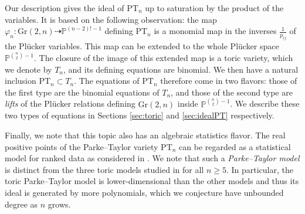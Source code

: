 \documentclass[12pt, reqno]{amsart}
\numberwithin{equation}{section}
\theoremstyle{plain}
\theoremstyle{definition}
\begin{document}
Our description gives the ideal of $\mathrm{PT}_n$ up to saturation by the product of the variables. It is based on the following observation: the map $\varphi_n:\mathrm{Gr}(2,n)\dashrightarrow \mathbb{P}^{(n-2)!-1}$ defining $\mathrm{PT}_n$ is a monomial map in the inverses $\frac{1}{p_{ij}}$ of the Pl\"ucker variables. This map can be extended to the whole Pl\"ucker space $\mathbb{P}^{\binom{n}{2}-1}$. The closure of the image of this extended map is a toric variety, which we denote by $T_n$, and its defining equations are binomial. We then have a natural inclusion $\mathrm{PT}_n\subset T_n$. The equations of $\mathrm{PT}_n$ therefore come in two flavors: those of the first type are the binomial equations of $T_n$, and those of the second type are \emph{lifts} of the Pl\"ucker relations defining $\mathrm{Gr}(2,n)$ inside $\mathbb{P}^{\binom{n}{2}-1}$. We describe these two types of equations in Sections \ref{sec:toric} and \ref{sec:idealPT} respectively.


Finally, we note that this topic also has an algebraic statistics flavor. The real positive points of the Parke--Taylor variety $\mathrm{PT}_n$ can be regarded as a statistical model for ranked data as considered in \cite{sturmfels2012statistical}. We note that such a \emph{Parke--Taylor model} is distinct from the three toric models studied in \cite{sturmfels2012statistical} for all $n \geq 5$. In particular, the toric Parke--Taylor model is lower-dimensional than the other models and thus its ideal is generated by more polynomials, which we conjecture have unbounded degree as $n$ grows. 
\end{document}
